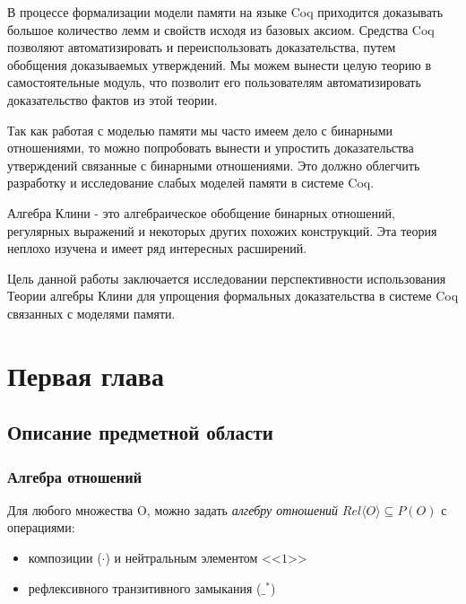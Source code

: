 \documentclass[times
              ]{itmo-student-thesis}
\begin{document}
В процессе формализации модели памяти на языке Coq приходится доказывать большое количество лемм и свойств исходя из базовых аксиом. Средства Coq позволяют автоматизировать и переиспользовать доказательства, путем обобщения доказываемых утверждений. Мы можем вынести целую теорию в самостоятельные модуль, что позволит его пользователям автоматизировать доказательство фактов из этой теории.

Так как работая с моделью памяти мы часто имеем дело с бинарными отношениями, то можно попробовать вынести и упростить доказательства утверждений связанные с бинарными отношениями.  Это должно облегчить разработку и исследование слабых моделей памяти в системе Coq.

Алгебра Клини - это алгебраическое обобщение бинарных отношений, регулярных выражений и некоторых других похожих конструкций. Эта теория неплохо изучена и имеет ряд интересных расширений.

Цель данной работы заключается исследовании перспективности использования Теории алгебры Клини для упрощения формальных доказательства в системе Coq связанных с моделями памяти.

\chapter{Первая глава}
  \section{Описание предметной области}



    \subsection{Алгебра отношений}
      Для любого множества O, можно задать \textit{алгебру отношений} $\mathit{Rel}\langle O \rangle \subseteq P(O) $ с операциями:
      \begin{itemize}
        \item композиции ($ \cdot $) и нейтральным элементом <<$1$>>
        \item рефлексивного транзитивного замыкания ($ \_^* $)
      \end{itemize}
\end{document}

